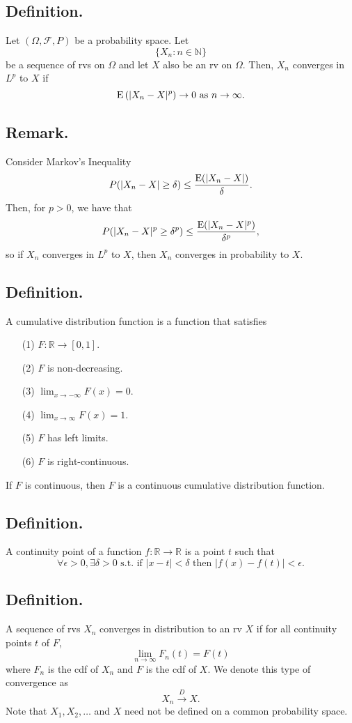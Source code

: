 \documentclass[titlepage]{article}
\begin{document}
\subsection{Definition.} Let $(\Omega, \mathcal{F}, P)$ be a probability space. Let
$$\{X_{n}: n \in \mathbb{N}\}$$
be a sequence of rvs on $\Omega$ and let $X$ also be an rv on $\Omega$. Then, $X_{n}$ converges in $L^{p}$ to $X$ if
$$\text{E}\left(|X_{n} - X|^{p}\right) \to 0 \text{ as } n \to \infty.$$

\subsection{Remark.} Consider Markov's Inequality 
$$P(|X_{n} - X| \geq \delta) \leq \frac{\text{E}(|X_{n} - X|)}{\delta}.$$
Then, for $p > 0$, we have that 
$$P(|X_{n} - X|^{p} \geq \delta^{p}) \leq \frac{\text{E}(|X_{n} - X|^{p})}{\delta^{p}},$$
so if $X_{n}$ converges in $L^{p}$ to $X$, then $X_{n}$ converges in probability to $X$.

\subsection{Definition.} A cumulative distribution function is a function that satisfies 
\begin{enumerate}
\item[(1)] $F: \mathbb{R} \to [0, 1]$.
\item[(2)] $F$ is non-decreasing.
\item[(3)] $\lim_{x \to -\infty}F(x) = 0$.
\item[(4)] $\lim_{x \to \infty}F(x) = 1$.
\item[(5)] $F$ has left limits.
\item[(6)] $F$ is right-continuous.
\end{enumerate}
If $F$ is continuous, then $F$ is a continuous cumulative distribution function.

\subsection{Definition.} A continuity point of a function $f: \mathbb{R} \to \mathbb{R}$ is a point $t$ such that 
$$\forall \epsilon > 0, \exists \delta > 0 \text{ s.t. if } |x - t| < \delta \text{ then } |f(x) - f(t)| < \epsilon.$$

\subsection{Definition.} A sequence of rvs $X_{n}$ converges in distribution to an rv $X$ if for all continuity points $t$ of $F$, 
$$\lim_{n \to \infty}F_{n}(t) = F(t)$$
where $F_{n}$ is the cdf of $X_{n}$ and $F$ is the cdf of $X$.
We denote this type of convergence as
$$X_{n} \xrightarrow{D} X.$$
Note that $X_{1}, X_{2}, \ldots$ and $X$ need not be defined on a common probability space.
\end{document}
